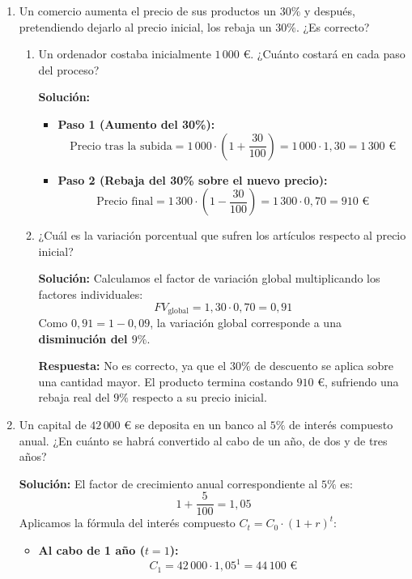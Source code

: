 \documentclass[a4paper,12pt]{article}
\begin{document}
\begin{enumerate}
    \item Un comercio aumenta el precio de sus productos un $30\%$ y después, pretendiendo dejarlo al precio inicial, los rebaja un $30\%$. ¿Es correcto?
        \begin{enumerate}
            \item Un ordenador costaba inicialmente $1\,000\text{ €}$. ¿Cuánto costará en cada paso del proceso?
            
            \textbf{Solución:}
            \begin{itemize}
                \item \textbf{Paso 1 (Aumento del 30\%):}
                \[
                \text{Precio tras la subida} = 1\,000 \cdot \left(1 + \frac{30}{100}\right) = 1\,000 \cdot 1{,}30 = 1\,300\text{ €}
                \]
                \item \textbf{Paso 2 (Rebaja del 30\% sobre el nuevo precio):}
                \[
                \text{Precio final} = 1\,300 \cdot \left(1 - \frac{30}{100}\right) = 1\,300 \cdot 0{,}70 = 910\text{ €}
                \]
            \end{itemize}

            \item ¿Cuál es la variación porcentual que sufren los artículos respecto al precio inicial?
            
            \textbf{Solución:}
            Calculamos el factor de variación global multiplicando los factores individuales:
            \[
            F V_{\text{global}} = 1{,}30 \cdot 0{,}70 = 0{,}91
            \]
            Como $0{,}91 = 1 - 0{,}09$, la variación global corresponde a una \textbf{disminución del $9\%$}.
            
            \textbf{Respuesta:} No es correcto, ya que el $30\%$ de descuento se aplica sobre una cantidad mayor. El producto termina costando $910\text{ €}$, sufriendo una rebaja real del $9\%$ respecto a su precio inicial.
        \end{enumerate}

    \item Un capital de $42\,000\text{ €}$ se deposita en un banco al $5\%$ de interés compuesto anual. ¿En cuánto se habrá convertido al cabo de un año, de dos y de tres años?
    
        \textbf{Solución:}
        El factor de crecimiento anual correspondiente al $5\%$ es:
        \[
        1 + \frac{5}{100} = 1{,}05
        \]
        Aplicamos la fórmula del interés compuesto $C_t = C_0 \cdot (1 + r)^t$:
        \begin{itemize}
            \item \textbf{Al cabo de 1 año ($t = 1$):}
            \[
            C_1 = 42\,000 \cdot 1{,}05^1 = 44\,100\text{ €}
            \]
            

\end{itemize}
\end{enumerate}
\end{document}
